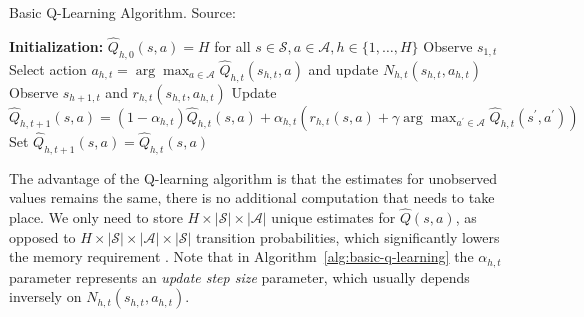\documentclass{mldsmsc}
\begin{document}
\begin{algorithm}
    \caption{Basic Q-Learning Algorithm. Source: \citep{pike-burke2024LearnigAgents}}\label{alg:basic-q-learning}
    \begin{algorithmic}[1]
        \State \textbf{Initialization:} $\hat{Q}_{h,0}(s,a) = H$ for all $s \in \mathcal{S}, a \in \mathcal{A}, h \in \{1, \ldots, H\}$
            \State Observe $s_{1,t}$
                \State Select action $a_{h,t} = \arg\max_{a \in \mathcal{A}}\hat{Q}_{h,t}(s_{h,t},a)$
                and update $N_{h,t}(s_{h,t}, a_{h,t})$
                \State Observe $s_{h+1, t}$ and $r_{h,t}(s_{h,t}, a_{h,t})$
                        \State Update $\hat{Q}_{h,t+1}(s,a) = (1- \alpha_{h,t})\hat{Q}_{h,t}(s,a) + \alpha_{h,t}(r_{h,t}(s, a) + \gamma \arg\max_{a^\prime \in \mathcal{A}}\hat{Q}_{h,t}(s^\prime,a^\prime))$
                    \Else
                        \State Set $\hat{Q}_{h,t+1}(s,a) = \hat{Q}_{h,t}(s,a)$
                    \EndIf
                    \EndFor
                \EndFor
            \EndFor
    \end{algorithmic}
\end{algorithm}

The advantage of the Q-learning algorithm is that the estimates for unobserved
values remains the same, there is no additional computation that needs to take place.
We only need to store $H \times |\mathcal{S}| \times |\mathcal{A}|$ unique estimates
for $\hat{Q}(s,a)$, as opposed to $H \times |\mathcal{S}| \times |\mathcal{A}| \times |\mathcal{S}|$
transition probabilities, which significantly lowers the memory requirement \citep{pike-burke2024LearnigAgents}.
Note that in Algorithm~\ref{alg:basic-q-learning} the $\alpha_{h,t}$ parameter represents an
\emph{update step size} parameter, which usually depends inversely on $N_{h,t}(s_{h,t}, a_{h,t})$.
\end{document}
